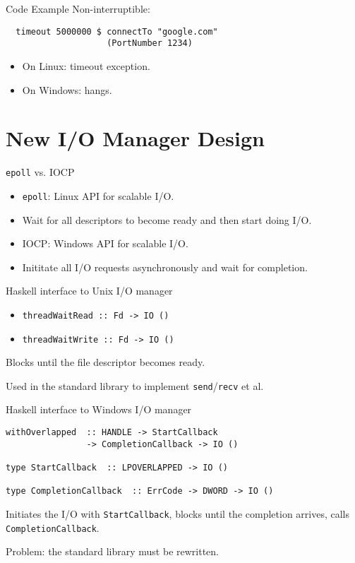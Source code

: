 \documentclass{beamer}
\begin{document}
\begin{frame}[fragile]{Code Example}
  Non-interruptible:
\begin{verbatim}
  timeout 5000000 $ connectTo "google.com"
                    (PortNumber 1234)
\end{verbatim}
  \begin{itemize}
  \item On Linux: timeout exception.
  \item On Windows: hangs.
  \end{itemize}
\end{frame}

\section {New I/O Manager Design}

\begin{frame}{\texttt{epoll} vs. IOCP}
  \begin{itemize}
  \item \texttt{epoll}: Linux API for scalable I/O.
  \item Wait for all descriptors to become ready and then start doing I/O.
  \item IOCP: Windows API for scalable I/O.
  \item Inititate all I/O requests asynchronously and wait for completion.
  \end{itemize}
\end{frame}

\begin{frame}{Haskell interface to Unix I/O manager}
\begin{itemize}
    \item \texttt{threadWaitRead  :: Fd -> IO ()}
    \item \texttt{threadWaitWrite :: Fd -> IO ()}
\end{itemize}
Blocks until the file descriptor becomes ready.

Used in the standard library to implement \texttt{send}/\texttt{recv} et al.
\end{frame}

\begin{frame}[fragile]{Haskell interface to Windows I/O manager}
\begin{verbatim}
withOverlapped  :: HANDLE -> StartCallback
                -> CompletionCallback -> IO ()

type StartCallback  :: LPOVERLAPPED -> IO ()

type CompletionCallback  :: ErrCode -> DWORD -> IO ()
\end{verbatim}
  Initiates the I/O with \texttt{StartCallback}, blocks until the completion
  arrives, calls \texttt{CompletionCallback}.

  Problem: the standard library must be rewritten.
\end{frame}
\end{document}
